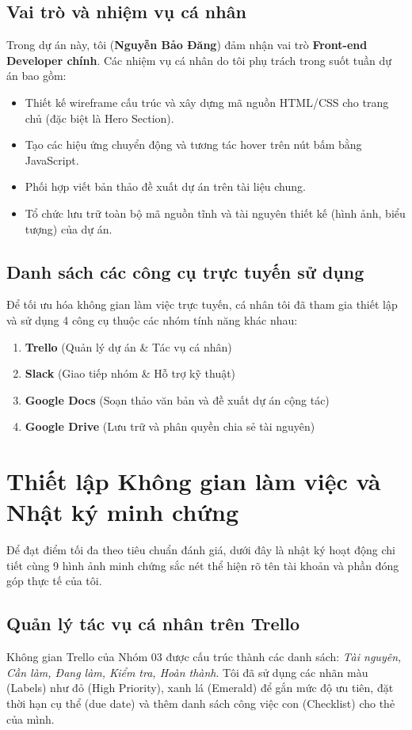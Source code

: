 \documentclass[12pt,a4paper]{article}
\begin{document}
\subsection{Vai trò và nhiệm vụ cá nhân}
Trong dự án này, tôi (\textbf{Nguyễn Bảo Đăng}) đảm nhận vai trò \textbf{Front-end Developer chính}. Các nhiệm vụ cá nhân do tôi phụ trách trong suốt tuần dự án bao gồm:
\begin{itemize}
    \item Thiết kế wireframe cấu trúc và xây dựng mã nguồn HTML/CSS cho trang chủ (đặc biệt là Hero Section).
    \item Tạo các hiệu ứng chuyển động và tương tác hover trên nút bấm bằng JavaScript.
    \item Phối hợp viết bản thảo đề xuất dự án trên tài liệu chung.
    \item Tổ chức lưu trữ toàn bộ mã nguồn tĩnh và tài nguyên thiết kế (hình ảnh, biểu tượng) của dự án.
\end{itemize}

\subsection{Danh sách các công cụ trực tuyến sử dụng}
Để tối ưu hóa không gian làm việc trực tuyến, cá nhân tôi đã tham gia thiết lập và sử dụng 4 công cụ thuộc các nhóm tính năng khác nhau:
\begin{enumerate}
    \item \textbf{Trello} (Quản lý dự án \& Tác vụ cá nhân)
    \item \textbf{Slack} (Giao tiếp nhóm \& Hỗ trợ kỹ thuật)
    \item \textbf{Google Docs} (Soạn thảo văn bản và đề xuất dự án cộng tác)
    \item \textbf{Google Drive} (Lưu trữ và phân quyền chia sẻ tài nguyên)
\end{enumerate}

\newpage
\section{Thiết lập Không gian làm việc và Nhật ký minh chứng}
Để đạt điểm tối đa theo tiêu chuẩn đánh giá, dưới đây là nhật ký hoạt động chi tiết cùng 9 hình ảnh minh chứng sắc nét thể hiện rõ tên tài khoản và phần đóng góp thực tế của tôi.

\subsection{Quản lý tác vụ cá nhân trên Trello}
Không gian Trello của Nhóm 03 được cấu trúc thành các danh sách: \textit{Tài nguyên, Cần làm, Đang làm, Kiểm tra, Hoàn thành}. Tôi đã sử dụng các nhãn màu (Labels) như đỏ (High Priority), xanh lá (Emerald) để gắn mức độ ưu tiên, đặt thời hạn cụ thể (due date) và thêm danh sách công việc con (Checklist) cho thẻ của mình.
\end{document}
